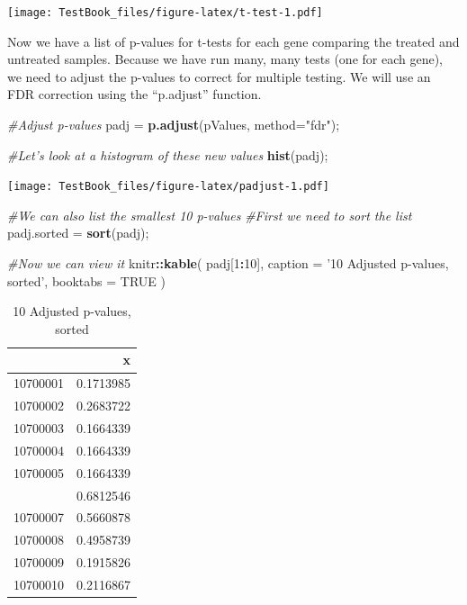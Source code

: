 \documentclass[
]{book}
\newenvironment{Shaded}{\begin{snugshade}}{\end{snugshade}}
\newcommand{\CommentTok}[1]{\textcolor[rgb]{0.56,0.35,0.01}{\textit{#1}}}
\newcommand{\DataTypeTok}[1]{\textcolor[rgb]{0.13,0.29,0.53}{#1}}
\newcommand{\DecValTok}[1]{\textcolor[rgb]{0.00,0.00,0.81}{#1}}
\newcommand{\KeywordTok}[1]{\textcolor[rgb]{0.13,0.29,0.53}{\textbf{#1}}}
\newcommand{\NormalTok}[1]{#1}
\newcommand{\OperatorTok}[1]{\textcolor[rgb]{0.81,0.36,0.00}{\textbf{#1}}}
\newcommand{\OtherTok}[1]{\textcolor[rgb]{0.56,0.35,0.01}{#1}}
\newcommand{\StringTok}[1]{\textcolor[rgb]{0.31,0.60,0.02}{#1}}
\begin{document}
\texttt{[image: TestBook\_files/figure-latex/t-test-1.pdf]}

Now we have a list of p-values for t-tests for each gene comparing the treated and untreated samples. Because we have run many, many tests (one for each gene), we need to adjust the p-values to correct for multiple testing. We will use an FDR correction using the ``p.adjust'' function.

\begin{Shaded}
\begin{Highlighting}[]
\CommentTok{#Adjust p-values}
\NormalTok{padj =}\StringTok{ }\KeywordTok{p.adjust}\NormalTok{(pValues, }\DataTypeTok{method=}\StringTok{"fdr"}\NormalTok{);}

\CommentTok{#Let's look at a histogram of these new values}
\KeywordTok{hist}\NormalTok{(padj);}
\end{Highlighting}
\end{Shaded}

\texttt{[image: TestBook\_files/figure-latex/padjust-1.pdf]}

\begin{Shaded}
\begin{Highlighting}[]
\CommentTok{#We can also list the smallest 10 p-values}
\CommentTok{#First we need to sort the list}
\NormalTok{padj.sorted =}\StringTok{ }\KeywordTok{sort}\NormalTok{(padj);}

\CommentTok{#Now we can view it}
\NormalTok{knitr}\OperatorTok{::}\KeywordTok{kable}\NormalTok{(}
\NormalTok{  padj[}\DecValTok{1}\OperatorTok{:}\DecValTok{10}\NormalTok{], }\DataTypeTok{caption =} \StringTok{'10 Adjusted p-values, sorted'}\NormalTok{,}
  \DataTypeTok{booktabs =} \OtherTok{TRUE}
\NormalTok{)}
\end{Highlighting}
\end{Shaded}

\begin{table}

\caption{\label{tab:padjust}10 Adjusted p-values, sorted}
\centering
\begin{tabular}[t]{lr}
\toprule
  & x\\
\midrule
10700001 & 0.1713985\\
10700002 & 0.2683722\\
10700003 & 0.1664339\\
10700004 & 0.1664339\\
10700005 & 0.1664339\\
\addlinespace
10700006 & 0.6812546\\
10700007 & 0.5660878\\
10700008 & 0.4958739\\
10700009 & 0.1915826\\
10700010 & 0.2116867\\
\bottomrule
\end{tabular}
\end{table}
\end{document}
